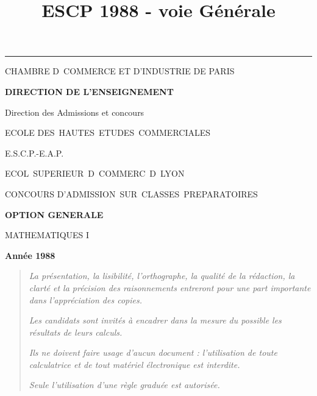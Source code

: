 \documentclass[11pt]{article}%
\title{\bf \vspace{-2cm} ESCP 1988 - voie Générale} %
\author{} %
\date{} %
\begin{document}
\maketitle %
\vspace{-1.4cm}\hrule %
\thispagestyle{fancy}

\vspace*{.2cm}




\begin{center}
{\small CHAMBRE D\E\ COMMERCE ET D'INDUSTRIE DE PARIS}

\textbf{DIRECTION DE L'ENSEIGNEMENT}

Direction des Admissions et concours

\underline{\hspace*{3cm}}

{\Large ECOLE DES\ HAUTES\ ETUDES\ COMMERCIALES}

{\Large E.S.C.P.-E.A.P.}

{\Large ECOL\E\ SUPERIEUR\E\ D\E\ COMMERC\E\ D\E\ LYON}{\large }

CONCOURS D'ADMISSION\ SUR\ CLASSES\ PREPARATOIRES

\underline{\hspace*{3cm}}

\textbf{OPTION GENERALE}

{\Large MATHEMATIQUES I}

\textbf{Année 1988}

\underline{\hspace*{3cm}}
\end{center}

\begin{quotation}
\noindent \textsl{La présentation, la lisibilité, l'orthographe, la
qualité
de la rédaction, la clarté et la précision des raisonnements entreront
pour
une part importante dans l'appréciation des copies.}

\noindent \textsl{Les candidats sont invités à encadrer dans la mesure
du
possible les résultats de leurs calculs.}

\noindent \textsl{Ils ne doivent faire usage d'aucun document :
l'utilisation de toute calculatrice et de tout matériel électronique
est
interdite.}

\noindent \textsl{Seule l'utilisation d'une règle graduée est
autorisée.}

\noindent \textsl{\hrulefill }
\end{quotation}
\end{document}
